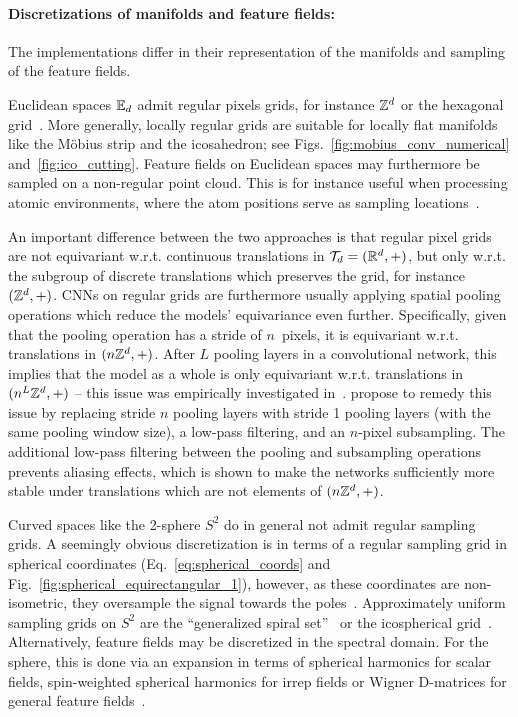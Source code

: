 \paragraph{Discretizations of manifolds and feature fields:}
The implementations differ in their representation of the manifolds and sampling of the feature fields.

Euclidean spaces $\mathbb{E}_d$ admit regular pixels grids, for instance $\mathbb{Z}^d$ or the hexagonal grid~\cite{Hoogeboom2018-HEX}.
More generally, locally regular grids are suitable for locally flat manifolds like the M\"obius strip and the icosahedron; see Figs.~\ref{fig:mobius_conv_numerical} and~\ref{fig:ico_cutting}.
Feature fields on Euclidean spaces may furthermore be sampled on a non-regular point cloud.
This is for instance useful when processing atomic environments, where the atom positions serve as sampling locations~\cite{Thomas2018-TFN}.

An important difference between the two approaches is that regular pixel grids are not equivariant w.r.t. continuous translations in $\mathcal{T}_d = (\mathbb{R}^d,+)$, but only w.r.t. the subgroup of discrete translations which preserves the grid, for instance~$(\mathbb{Z}^d,+)$.
CNNs on regular grids are furthermore usually applying spatial pooling operations which reduce the models' equivariance even further.
Specifically, given that the pooling operation has a stride of $n$~pixels, it is equivariant w.r.t. translations in $(n\mathbb{Z}^d,+)$.
After $L$ pooling layers in a convolutional network, this implies that the model as a whole is only equivariant w.r.t. translations in $(n^L\mathbb{Z}^d,+)$
-- this issue was empirically investigated in~\cite{azulay2018shift}.
\citet{zhang2019CNNsShiftInvariant} propose to remedy this issue by replacing stride $n$ pooling layers with stride 1 pooling layers (with the same pooling window size), a low-pass filtering, and an $n$-pixel subsampling.
The additional low-pass filtering between the pooling and subsampling operations prevents aliasing effects, which is shown to make the networks sufficiently more stable under translations which are not elements of $(n\mathbb{Z}^d,+)$.


Curved spaces like the 2-sphere $S^2$ do in general not admit regular sampling grids.
A seemingly obvious discretization is in terms of a regular sampling grid in spherical coordinates (Eq.~\eqref{eq:spherical_coords} and Fig.~\ref{fig:spherical_equirectangular_1}), however, as these coordinates are non-isometric, they oversample the signal towards the poles~\cite{zhao2018distortion,tateno2018distortion}.
Approximately uniform sampling grids on $S^2$ are the ``generalized spiral set''~\cite{coors2018spherenet} or the icospherical grid~\cite{jiang2019spherical,kicanaoglu2019gaugeSphere}.
Alternatively, feature fields may be discretized in the spectral domain.
For the sphere, this is done via an expansion in terms of spherical harmonics for scalar fields, spin-weighted spherical harmonics for irrep fields or Wigner D-matrices for general feature fields~\cite{esteves2018zonalSpherical,esteves2020spinweighted,Cohen2018-S2CNN,kondor2018ClebschGordan}.

